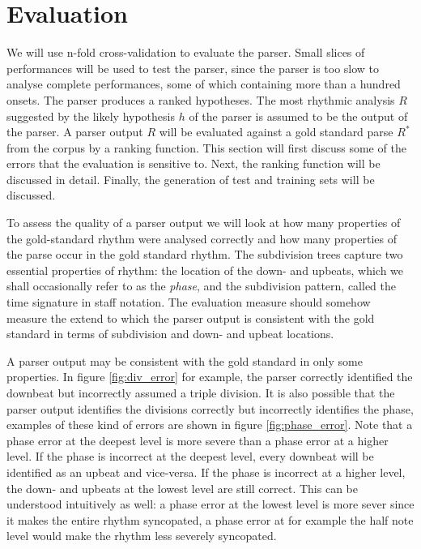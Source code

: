 \chapter{Evaluation}
\label{sec:evaluation}




We will use n-fold cross-validation to evaluate the parser. Small slices of performances will be used to test the parser, since the parser is too slow to analyse complete performances, some of which containing more than a hundred onsets.  The parser produces a ranked hypotheses. The most rhythmic analysis $R$ suggested by the likely hypothesis $h$ of the parser is assumed to be the output of the parser. A parser output $R$ will be evaluated against a gold standard parse $R^*$ from the corpus by a ranking function. This section will first discuss some of the errors that the evaluation is sensitive to. Next, the ranking function will be discussed in detail. Finally, the generation of test and training sets will be discussed.

To assess the quality of a parser output we will look at how many properties of the gold-standard rhythm were analysed correctly and how many properties of the parse occur in the gold standard rhythm. The subdivision trees capture two essential properties of rhythm: the location of the down- and upbeats, which we shall occasionally refer to as the \textit{phase}, and the subdivision pattern, called the time signature in staff notation. The evaluation measure should somehow measure the extend to which the parser output is consistent with the gold standard in terms of subdivision and down- and upbeat locations. 

A parser output may be consistent with the gold standard in only some properties. In figure \ref{fig:div_error} for example, the parser correctly identified the downbeat but incorrectly assumed a triple division. It is also possible that the parser output identifies the divisions correctly but incorrectly identifies the phase, examples of these kind of errors are shown in figure \ref{fig:phase_error}. Note that a phase error at the deepest level is more severe than a phase error at a higher level. If the phase is incorrect at the deepest level, every downbeat will be identified as an upbeat and vice-versa. If the phase is incorrect at a higher level, the down- and upbeats at the lowest level are still correct. This can be understood intuitively as well: a phase error at the lowest level is more sever since it makes the entire rhythm syncopated, a phase error at for example the half note level would make the rhythm less severely syncopated.


